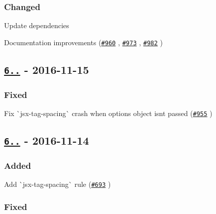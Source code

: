 \subsubsection*{Changed}


\begin{DoxyItemize}
\item Update dependencies
\item Documentation improvements (\href{https://github.com/yannickcr/eslint-plugin-react/pull/960}{\tt \#960} , \href{https://github.com/yannickcr/eslint-plugin-react/pull/973}{\tt \#973} , \href{https://github.com/yannickcr/eslint-plugin-react/pull/982}{\tt \#982} )
\end{DoxyItemize}

\subsection*{\href{https://github.com/yannickcr/eslint-plugin-react/compare/v6.7.0...v6.7.1}{\tt 6..} -\/ 2016-\/11-\/15}

\subsubsection*{Fixed}


\begin{DoxyItemize}
\item Fix \`{}jsx-\/tag-\/spacing\`{} crash when options object isn\textquotesingle{}t passed (\href{https://github.com/yannickcr/eslint-plugin-react/issues/955}{\tt \#955} )
\end{DoxyItemize}

\subsection*{\href{https://github.com/yannickcr/eslint-plugin-react/compare/v6.6.0...v6.7.0}{\tt 6..} -\/ 2016-\/11-\/14}

\subsubsection*{Added}


\begin{DoxyItemize}
\item Add \`{}jsx-\/tag-\/spacing\`{} rule (\href{https://github.com/yannickcr/eslint-plugin-react/issues/693}{\tt \#693} )
\end{DoxyItemize}

\subsubsection*{Fixed}


